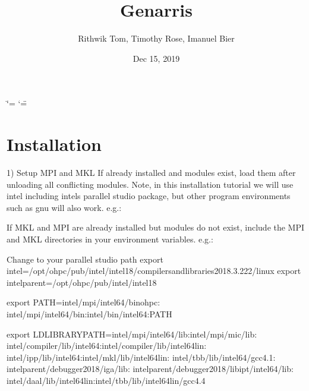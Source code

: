 \documentclass[letterpaper,10pt,english]{sphinxmanual}
\title{Genarris}
\date{Dec 15, 2019}
\author{Rithwik Tom, Timothy Rose, Imanuel Bier}
\begin{document}
\ifdefined\shorthandoff
  \ifnum\catcode`\=\string=\active\shorthandoff{=}\fi
  \ifnum\catcode`\"=\active{}\fi
\fi

\pagestyle{empty}
\sphinxmaketitle
\pagestyle{plain}
\sphinxtableofcontents
\pagestyle{normal}
\label{\detokenize{index::doc}}



\chapter{Installation}
\label{\detokenize{index:installation}}
1) Setup MPI and MKL
If already installed and modules exist, load them after unloading all conflicting modules. Note, in this installation tutorial we will use intel including intel\textquotesingle{}s parallel studio package, but other program environments such as gnu will also work.
e.g.:

\begin{sphinxVerbatim}[commandchars=\\\{\}]
  
  
  
  
\end{sphinxVerbatim}

If MKL and MPI are already installed but modules do not exist, include the MPI and MKL directories in your environment variables.
e.g.:

\begin{sphinxVerbatim}[commandchars=\\\{\}]
\PYGZsh{}Change to your parallel studio path
export \PYGZdl{}intel=/opt/ohpc/pub/intel/intel18/compilers\PYGZus{}and\PYGZus{}libraries\PYGZus{}2018.3.222/linux
export \PYGZdl{}intel\PYGZus{}parent=/opt/ohpc/pub/intel/intel18

export PATH=\PYGZdq{}\PYGZdl{}intel/mpi/intel64/bin\PYGZus{}ohpc:\PYGZbs{}
\PYGZdl{}intel/mpi/intel64/bin:\PYGZdl{}intel/bin/intel64:\PYGZdl{}PATH\PYGZdq{}

export LD\PYGZus{}LIBRARY\PYGZus{}PATH=\PYGZdq{}\PYGZdl{}intel/mpi/intel64/lib:\PYGZdl{}intel/mpi/mic/lib:\PYGZbs{}
\PYGZdl{}intel/compiler/lib/intel64:\PYGZdl{}intel/compiler/lib/intel64\PYGZus{}lin:\PYGZbs{}
\PYGZdl{}intel/ipp/lib/intel64:\PYGZdl{}intel/mkl/lib/intel64\PYGZus{}lin:\PYGZbs{}
\PYGZdl{}intel/tbb/lib/intel64/gcc4.1:\PYGZbs{}
\PYGZdl{}intel\PYGZus{}parent/debugger\PYGZus{}2018/iga/lib:\PYGZbs{}
\PYGZdl{}intel\PYGZus{}parent/debugger\PYGZus{}2018/libipt/intel64/lib:\PYGZbs{}
\PYGZdl{}intel/daal/lib/intel64\PYGZus{}lin:\PYGZdl{}intel/tbb/lib/intel64\PYGZus{}lin/gcc4.4\PYGZdq{}
\end{sphinxVerbatim}
\end{document}
